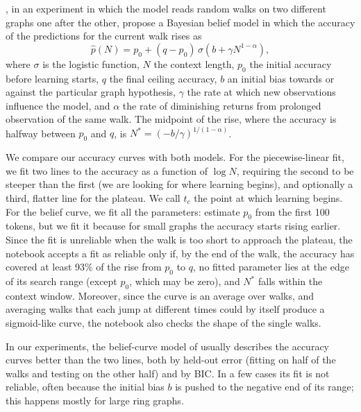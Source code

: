 \documentclass[11pt,a4paper]{article}
\begin{document}
\citet{kowalyshyn2026}, in an experiment in which the model reads random walks on two different graphs one after the
other, propose a Bayesian belief model in which the accuracy of the predictions for the current walk rises as
\[
  \hat{p}(N) = p_0 + (q - p_0)\,\sigma\!\left(b + \gamma N^{1-\alpha}\right),
\]
where $\sigma$ is the logistic function, $N$ the context length, $p_0$ the initial accuracy before learning starts, $q$
the final ceiling accuracy, $b$ an initial bias towards or against the particular graph hypothesis, $\gamma$ the rate
at which new observations influence the model, and $\alpha$ the rate of diminishing returns from prolonged observation
of the same walk. The midpoint of the rise, where the accuracy is halfway between $p_0$ and $q$, is
$N^* = (-b/\gamma)^{1/(1-\alpha)}$.

We compare our accuracy curves with both models. For the piecewise-linear fit, we fit two lines to the accuracy as a
function of $\log N$, requiring the second to be steeper than the first (we are looking for where learning begins),
and optionally a third, flatter line for the plateau. We call $t_c$ the point at which learning begins. For the belief
curve, we fit all the parameters: \citet{kowalyshyn2026} estimate $p_0$ from the first 100 tokens, but we fit it
because for small graphs the accuracy starts rising earlier. Since the fit is unreliable when the walk is too short to
approach the plateau, the notebook accepts a fit as reliable only if, by the end of the walk, the accuracy has covered
at least 93\% of the rise from $p_0$ to $q$, no fitted parameter lies at the edge of its search range (except $p_0$,
which may be zero), and $N^*$ falls within the context window. Moreover, since the curve is an average over walks, and
averaging walks that each jump at different times could by itself produce a sigmoid-like curve, the notebook also
checks the shape of the single walks.

In our experiments, the belief-curve model of \citet{kowalyshyn2026} usually describes the accuracy curves better than
the two lines, both by held-out error (fitting on half of the walks and testing on the other half) and by BIC. In a few cases its fit is not reliable, often because the initial bias $b$ is pushed to the
negative end of its range; this happens mostly for large ring graphs.
\end{document}
